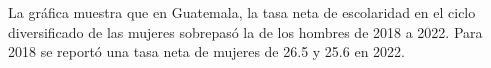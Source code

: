 La gráfica muestra que en Guatemala, la tasa neta de escolaridad en el ciclo diversificado
de las mujeres sobrepasó la de los hombres de 2018 a 2022. Para 2018 se reportó una tasa neta de mujeres de 26.5 y 25.6 en 2022.